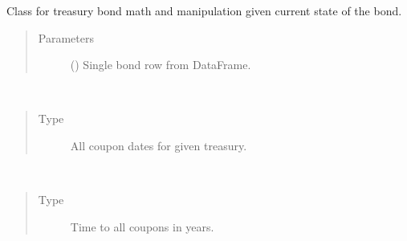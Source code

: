 \documentclass[letterpaper,10pt,english]{report}
\begin{document}
\begin{fulllineitems}
\label{\detokenize{index:lgimapy.models.TBond}}
Class for treasury bond math and manipulation given current
state of the bond.
\begin{quote}\begin{description}
\item[{Parameters}] \leavevmode
{} () \textendash{} Single bond row from  DataFrame.

\end{description}\end{quote}

\begin{fulllineitems}
\label{\detokenize{index:lgimapy.models.TBond.coupon_dates}}~\begin{quote}\begin{description}
\item[{Type}] \leavevmode
All coupon dates for given treasury.

\end{description}\end{quote}

\end{fulllineitems}


\begin{fulllineitems}
\label{\detokenize{index:lgimapy.models.TBond.coupon_years}}~\begin{quote}\begin{description}
\item[{Type}] \leavevmode
Time to all coupons in years.

\end{description}\end{quote}

\end{fulllineitems}




\end{fulllineitems}
\end{document}
